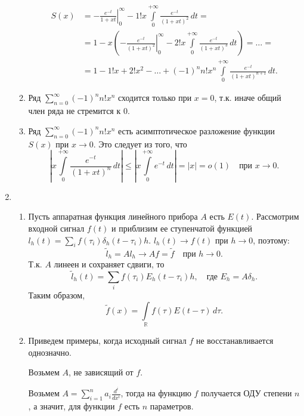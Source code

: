 \documentclass[a4paper]{article}
\begin{document}
\begin{enumerate}
\begin{enumerate}
          \begin{align*}
          S(x)&=\left.-\frac{e^{-t}}{1+xt}\right|_0^\infty -
          1!x\int\limits_0^{+\infty}\!\frac{e^{-t}}{(1+xt)^2}\,dt=\\
          &=1-x\left(\left.-\frac{e^{-t}}{(1+xt)^2}\right|_0^\infty
          -2!x\int\limits_0^{+\infty}\!\frac{e^{-t}}{(1+xt)^3}\,dt\right)=\ldots=\\
          &=1-1!x+2!x^2-\ldots+(-1)^nn!x^n\int\limits_0^{+\infty}\!\frac{e^{-t}}{(1+xt)^{n+1}}\,dt.
          \end{align*}
          \item Ряд $\sum\limits_{n=0}^\infty(-1)^nn!x^n$ сходится
          только при $x=0$, т.к. иначе общий член ряда не стремится
          к 0.
          \item Ряд $\sum\limits_{n=0}^\infty(-1)^nn!x^n$ есть
          асимптотическое разложение функции $S(x)$ при $x\rightarrow0$. Это следует из
          того, что $$\left|x\int\limits_0^{+\infty}\!\frac{e^{-t}}{(1+xt)^n}\,dt\right|\leqslant
          \left|x\int\limits_0^{+\infty}\!e^{-t}\,dt\right|=|x|=o(1)\quad \text{при $x\rightarrow 0$}.$$
        \end{enumerate}
  \item \begin{enumerate}
          \item Пусть аппаратная функция линейного прибора $A$ есть
          $E(t)$. Рассмотрим входной сигнал $f(t)$ и приблизим ее
          ступенчатой функцией $l_h(t)=\sum\limits_i
          f(\tau_i)\delta_h(t-\tau_i)h$. $l_h(t)\rightarrow f(t)$ при $h\rightarrow 0$, поэтому:
          $$\widetilde{l}_h=Al_h\rightarrow Af=\widetilde{f} \quad \text{при $h\rightarrow 0$}.$$
          Т.к. $A$ линеен и сохраняет сдвиги, то
          $$\widetilde{l}_h(t)=\sum\limits_i f(\tau_i)E_h(t-\tau_i)h, \quad \text{где $E_h=A\delta_h$}.$$
          Таким образом,
          $$\widetilde{f}(x)=\int\limits_{\mathbb{R}}\!f(\tau)E(t-\tau)\,d\tau.$$
          \item Приведем примеры, когда исходный сигнал $f$ не
          восстанавливается однозначно.

          Возьмем $A$, не зависящий от $f$.

          Возьмем $A=\sum\limits_{i=1}^n a_i\frac{d^i}{dx^i}$, тогда
          на функцию $f$ получается ОДУ степени $n$, а значит, для
          функции $f$ есть $n$ параметров.
        \end{enumerate}
\end{enumerate}

\medskip\dmvntrail
\end{document}
